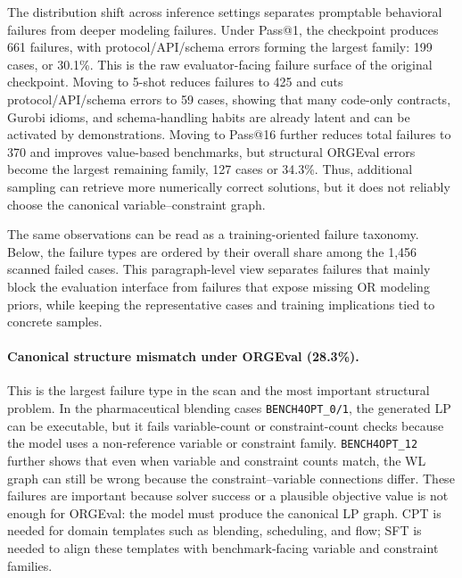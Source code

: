 The distribution shift across inference settings separates promptable
behavioral failures from deeper modeling failures. Under Pass@1, the checkpoint
produces 661 failures, with protocol/API/schema errors forming the largest
family: 199 cases, or 30.1\%. This is the raw evaluator-facing failure
surface of the original checkpoint. Moving to 5-shot reduces failures to 425
and cuts protocol/API/schema errors to 59 cases, showing that many code-only
contracts, Gurobi idioms, and schema-handling habits are already latent and can
be activated by demonstrations. Moving to Pass@16 further reduces total
failures to 370 and improves value-based benchmarks, but structural ORGEval
errors become the largest remaining family, 127 cases or 34.3\%. Thus,
additional sampling can retrieve more numerically correct solutions, but it
does not reliably choose the canonical variable--constraint graph.

The same observations can be read as a training-oriented failure taxonomy.
Below, the failure types are ordered by their overall share among the 1,456
scanned failed cases. This paragraph-level view separates failures that mainly
block the evaluation interface from failures that expose missing OR modeling
priors, while keeping the representative cases and training implications tied
to concrete samples.

\paragraph{Canonical structure mismatch under ORGEval (28.3\%).}
This is the largest failure type in the scan and the most important structural
problem. In the pharmaceutical blending cases \texttt{BENCH4OPT\_0/1}, the
generated LP can be executable, but it fails variable-count or
constraint-count checks because the model uses a non-reference variable or
constraint family. \texttt{BENCH4OPT\_12} further shows that even when variable
and constraint counts match, the WL graph can still be wrong because the
constraint--variable connections differ. These failures are important because
solver success or a plausible objective value is not enough for ORGEval: the
model must produce the canonical LP graph. CPT is needed for domain templates
such as blending, scheduling, and flow; SFT is needed to align these templates
with benchmark-facing variable and constraint families.

